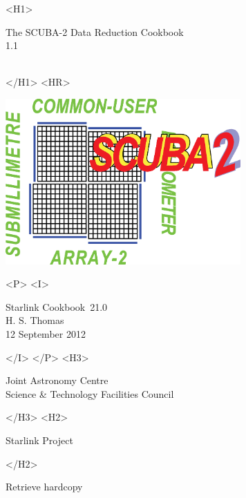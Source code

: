 \documentclass[twoside,11pt]{article}
\newcommand{\stardoccategory}  {Starlink Cookbook}
\newcommand{\stardocsource}    {sc\stardocnumber}
\newcommand{\stardocnumber}    {21.0}
\newcommand{\stardocauthors}   {H. S. Thomas}
\newcommand{\stardocdate}      {12 September 2012}
\newcommand{\stardoctitle}     {The SCUBA-2 Data Reduction Cookbook}
\newcommand{\stardocversion}   {1.1}
\newcommand{\stardocmanual}    {\ }
\newcommand{\htmladdnormallink}[2]{#1}
\newcommand{\htmladdimg}[1]{}
\newcommand{\xlabel}[1]{}
\renewcommand{\_}{\texttt{\symbol{95}}}
\begin{document}
\begin{htmlonly}
   \xlabel{}
   \begin{rawhtml} <H1> \end{rawhtml}
      \stardoctitle\\
      \stardocversion\\
      \stardocmanual
   \begin{rawhtml} </H1> <HR> \end{rawhtml}

   \includegraphics[width=90mm]{sc21_s2logo.eps}

   \begin{rawhtml} <P> <I> \end{rawhtml}
   \stardoccategory\ \stardocnumber \\
   \stardocauthors \\
   \stardocdate
   \begin{rawhtml} </I> </P> <H3> \end{rawhtml}
      \htmladdnormallink{Joint Astronomy Centre}
                        {http://www.jach.hawaii.edu}\\
      \htmladdnormallink{Science \& Technology Facilities Council}
                        {http://www.scitech.ac.uk} \\
   \begin{rawhtml} </H3> <H2> \end{rawhtml}
      \htmladdnormallink{Starlink Project}{http://www.starlink.ac.uk/}
   \begin{rawhtml} </H2> \end{rawhtml}
   \htmladdnormallink{\htmladdimg{source.gif} Retrieve hardcopy}
      {http://www.starlink.ac.uk/cgi-bin/hcserver?\stardocsource}\\


\end{htmlonly}
\end{document}
